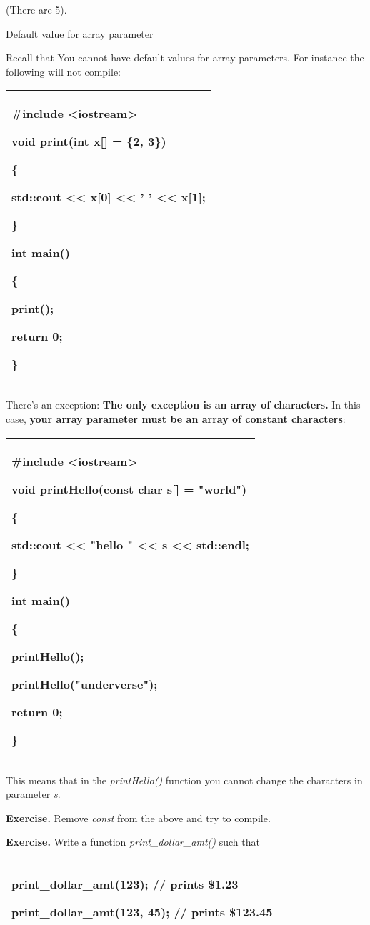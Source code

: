 \documentclass[
]{article}
\begin{document}
(There are 5).

Default value for array parameter

Recall that You cannot have default values for array parameters. For
instance the following will not compile:

\begin{longtable}[]{@{}l@{}}
\toprule
\endhead
\begin{minipage}[t]{0.97\columnwidth}\raggedright
\#include \textless iostream\textgreater{}

void print(int x{[}{]} = \{2, 3\})

\{

std::cout \textless\textless{} x{[}0{]} \textless\textless{} ' '
\textless\textless{} x{[}1{]};

\}

int main()

\{

print();

return 0;

\}\strut
\end{minipage}\tabularnewline
\bottomrule
\end{longtable}

There's an exception: \textbf{The only exception is an array of
characters. }In this case, \textbf{your array parameter must be an array
of constant characters}:

\begin{longtable}[]{@{}l@{}}
\toprule
\endhead
\begin{minipage}[t]{0.97\columnwidth}\raggedright
\#include \textless iostream\textgreater{}

void printHello(\textbf{const} char s{[}{]} = "world")

\{

std::cout \textless\textless{} "hello " \textless\textless{} s
\textless\textless{} std::endl;

\}

int main()

\{

printHello();

printHello("underverse");

return 0;

\}\strut
\end{minipage}\tabularnewline
\bottomrule
\end{longtable}

This means that in the \emph{printHello()} function you cannot change
the characters in parameter \emph{s}.

\textbf{Exercise.} Remove \emph{const} from the above and try to
compile.

\textbf{Exercise.} Write a function \emph{print\_dollar\_amt()} such
that

\begin{longtable}[]{@{}l@{}}
\toprule
\endhead
\begin{minipage}[t]{0.97\columnwidth}\raggedright
print\_dollar\_amt(123); // prints \$1.23

print\_dollar\_amt(123, 45); // prints \$123.45\strut
\end{minipage}\tabularnewline
\bottomrule
\end{longtable}
\end{document}

